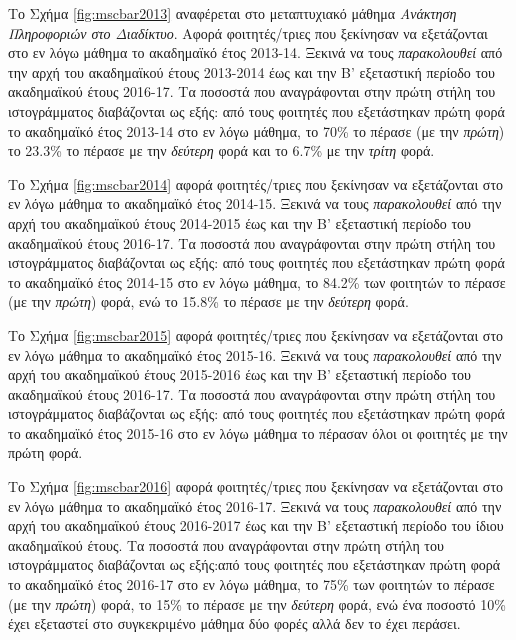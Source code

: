 \documentclass[12pt,a4paper,final]{article}
\begin{document}
\clearpage
Το Σχήμα \ref{fig:mscbar2013} αναφέρεται στο μεταπτυχιακό  μάθημα \textit{Ανάκτηση Πληροφοριών στο Διαδίκτυο}. Αφορά φοιτητές/τριες που ξεκίνησαν να εξετάζονται στο εν λόγω μάθημα το ακαδημαϊκό έτος 2013-14. Ξεκινά να τους \textit{παρακολουθεί} από την αρχή του ακαδημαϊκού έτους 2013-2014 έως και την Β' εξεταστική περίοδο του ακαδημαϊκού έτους 2016-17. Τα ποσοστά που αναγράφονται στην πρώτη στήλη του ιστογράμματος διαβάζονται ως εξής: από τους φοιτητές που εξετάστηκαν πρώτη φορά το ακαδημαϊκό έτος 2013-14 στο εν λόγω μάθημα, το 70\% το πέρασε (με την \textit{πρώτη}) το 23.3\% το πέρασε με την \textit{δεύτερη} φορά και το 6.7\% με την \textit{τρίτη} φορά.\medskip

Το Σχήμα \ref{fig:mscbar2014} αφορά φοιτητές/τριες που ξεκίνησαν να εξετάζονται στο εν λόγω μάθημα το ακαδημαϊκό έτος 2014-15. Ξεκινά να τους \textit{παρακολουθεί} από την αρχή του ακαδημαϊκού έτους 2014-2015 έως και την Β' εξεταστική περίοδο του ακαδημαϊκού έτους 2016-17. Τα ποσοστά που αναγράφονται στην πρώτη στήλη του ιστογράμματος διαβάζονται ως εξής: από τους φοιτητές που εξετάστηκαν πρώτη φορά το ακαδημαϊκό έτος 2014-15 στο εν λόγω μάθημα, το 84.2\% των φοιτητών το πέρασε (με την \textit{πρώτη}) φορά, ενώ το 15.8\% το πέρασε με την \textit{δεύτερη} φορά.\medskip

Το Σχήμα \ref{fig:mscbar2015} αφορά φοιτητές/τριες που ξεκίνησαν να εξετάζονται στο εν λόγω μάθημα το ακαδημαϊκό έτος 2015-16. Ξεκινά να τους \textit{παρακολουθεί} από την αρχή του ακαδημαϊκού έτους 2015-2016 έως και την Β' εξεταστική περίοδο του ακαδημαϊκού έτους 2016-17. Τα ποσοστά που αναγράφονται στην πρώτη στήλη του ιστογράμματος διαβάζονται ως εξής: από τους φοιτητές που εξετάστηκαν πρώτη φορά το ακαδημαϊκό έτος 2015-16 στο εν λόγω μάθημα το πέρασαν όλοι οι φοιτητές με την πρώτη φορά.\medskip

Το Σχήμα \ref{fig:mscbar2016} αφορά φοιτητές/τριες που ξεκίνησαν να εξετάζονται στο εν λόγω μάθημα το ακαδημαϊκό έτος 2016-17. Ξεκινά να τους \textit{παρακολουθεί} από την αρχή του ακαδημαϊκού έτους 2016-2017 έως και την Β' εξεταστική περίοδο του ίδιου ακαδημαϊκού έτους. Τα ποσοστά που αναγράφονται στην πρώτη στήλη του ιστογράμματος διαβάζονται ως εξής:από τους φοιτητές που εξετάστηκαν πρώτη φορά το ακαδημαϊκό έτος 2016-17 στο εν λόγω μάθημα, το 75\% των φοιτητών το πέρασε (με την \textit{πρώτη}) φορά, το 15\% το πέρασε με την \textit{δεύτερη }φορά, ενώ ένα ποσοστό 10\% έχει εξεταστεί στο συγκεκριμένο μάθημα δύο φορές αλλά δεν το έχει περάσει.
\end{document}
